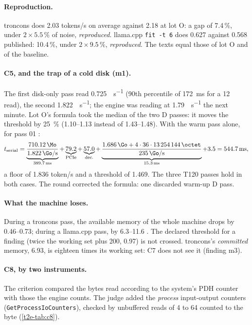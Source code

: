 \paragraph{Reproduction.} troncons does \num{2.03} tokens/s on average against \num{2.18} at lot O: a gap of \num{7.4}\,\%, under $2 \times 5.5\,\%$ of noise, \emph{reproduced}. llama.cpp \texttt{fit -t 6} does \num{0.627} against \num{0.568} published: \num{10.4}\,\%, under $2 \times 9.5\,\%$, \emph{reproduced}. The texts equal those of lot O and of the baseline.

\paragraph{C5, and the trap of a cold disk (m1).} The first disk-only pass read \SI{0.725}{\Go\per\second} (90th percentile of \SI{172}{\milli\second} for a \SI{12}{\Mo} read), the second \SI{1.822}{\Go\per\second}; the engine was reading at \SI{1.79}{\Go\per\second} the next minute. Lot O's formula took the median of the two D passes: it moves the threshold by \SI{25}{\percent} (\numrange{1.10}{1.13} instead of \numrange{1.43}{1.48}). With the warm pass alone, for pass 01 \calc:
\[
t_{\text{serial}} = \underbrace{\frac{\SI{710.12}{\Mo}}{\SI{1.822}{\Go\per\second}}}_{\SI{389.7}{\milli\second}} + \underbrace{79.2}_{\text{PCIe}} + \underbrace{57.0}_{\text{dec.}} + \underbrace{\frac{\SI{1.686}{\Go} + 4 \cdot 36 \cdot \SI{13254144}{\octet}}{\SI{235}{\Go\per\second}}}_{\SI{15.3}{\milli\second}} + 3.5 = \SI{544.7}{\milli\second},
\]
a floor of \num{1.836} token/s and a threshold of \num{1.469}. The three T120 passes hold in both cases. The round corrected the formula: one discarded warm-up D pass.

\paragraph{What the machine loses.} During a troncons pass, the available memory of the whole machine drops by \SIrange{0.46}{0.73}{\Go}; during a llama.cpp pass, by \SIrange{6.3}{11.6}{\Go} \mes. The declared threshold for a finding (twice the working set plus \SI{200}{\Mo}, \SI{0.97}{\Go}) is not crossed. troncons's \emph{committed} memory, \SI{6.93}{\Go}, is eighteen times its working set: C7 does not see it (finding m3).

\paragraph{C8, by two instruments.} The criterion compared the bytes read according to the system's PDH counter with those the engine counts. The judge added the \emph{process} input-output counters (\texttt{GetProcessIoCounters}), checked by unbuffered reads of \SI{4}{\Kio} to \SI{64}{\Mio} counted to the byte (\cref{t2e-tab:c8}).

